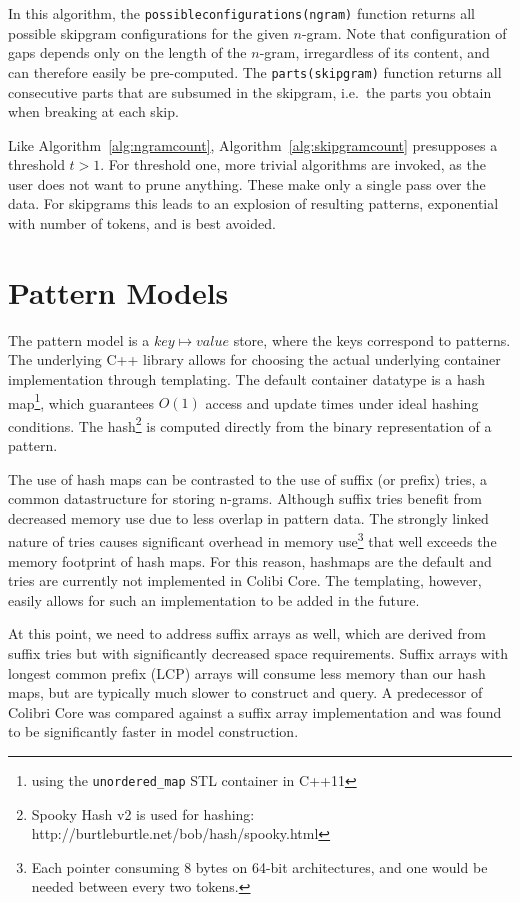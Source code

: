 \documentclass[review]{elsarticle}
\begin{document}
In this algorithm, the \texttt{possibleconfigurations(ngram)} function returns
all possible skipgram configurations for the given $n$-gram. Note that
configuration of gaps depends only on the length of the $n$-gram, irregardless
of its content, and can therefore easily be pre-computed. The
\texttt{parts(skipgram)} function returns all consecutive parts that are
subsumed in the skipgram, i.e.\ the parts you obtain when breaking at each
skip.

Like Algorithm~\ref{alg:ngramcount}, Algorithm~\ref{alg:skipgramcount}
presupposes a threshold $t>1$. For threshold one, more trivial algorithms are
invoked, as the user does not want to prune anything. These make only a single
pass over the data. For skipgrams this leads to an explosion of
resulting patterns, exponential with number of tokens, and is best avoided.

\section{Pattern Models}

The pattern model is a $key \mapsto value$ store, where the keys correspond to
patterns. The underlying C++ library allows for choosing the actual underlying
container implementation through templating. The default container datatype is
a hash map\footnote{using the \texttt{unordered\_map} STL container in C++11},
which guarantees $O(1)$ access and update times under ideal hashing conditions. The
hash\footnote{Spooky Hash v2 is used for hashing:
http://burtleburtle.net/bob/hash/spooky.html} is computed directly from the
binary representation of a pattern.

The use of hash maps can be contrasted to the use of suffix (or prefix) tries,
a common datastructure for storing n-grams. Although suffix tries benefit from
decreased memory use due to less overlap in pattern data. The strongly linked
nature of tries causes significant overhead in memory use\footnote{Each pointer
consuming 8 bytes on 64-bit architectures, and one would be needed between
every two tokens.} that well exceeds the memory footprint of hash maps. For
this reason, hashmaps are the default and tries are currently not implemented
in Colibi Core. The templating, however, easily allows for such an
implementation to be added in the future.

At this point, we need to address suffix arrays \citep{Manber90} as well, which
are derived from suffix tries but with significantly decreased space
requirements. Suffix arrays with longest common prefix (LCP) arrays will
consume less memory than our hash maps, but are typically much slower to construct
and query. A predecessor of Colibri Core was compared against a suffix array
implementation \citep{Stehouwer10} and was found to be significantly faster in
model construction.
\end{document}
